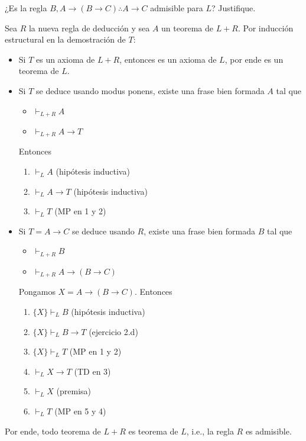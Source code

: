 \begin{exercise}
¿Es la regla $B, A \to (B \to C) \therefore A \to C$ admisible para $L$? Justifique.
\end{exercise}

\begin{solution}
Sea $R$ la nueva regla de deducción y sea $A$ un teorema de $L+R$. Por inducción estructural en la demostración de $T$:

\begin{itemize}
    \item Si $T$ es un axioma de $L+R$, entonces es un axioma de $L$, por ende es un teorema de $L$.
    \item Si $T$ se deduce usando modus ponens, existe una frase bien formada $A$ tal que
    \begin{itemize}
        \item $\vdash_{L+R} A$
        \item $\vdash_{L+R} A \to T$
    \end{itemize}
    
    Entonces
    \begin{enumerate}
        \item $\vdash_L A$       \hfill (hipótesis inductiva)
        \item $\vdash_L A \to T$ \hfill (hipótesis inductiva)
        \item $\vdash_L T$       \hfill (MP en 1 y 2)
    \end{enumerate}
    
    \item Si $T = A \to C$ se deduce usando $R$, existe una frase bien formada $B$ tal que
    \begin{itemize}
        \item $\vdash_{L+R} B$
        \item $\vdash_{L+R} A \to (B \to C)$
    \end{itemize}
    
    Pongamos $X = A \to (B \to C)$. Entonces
    \begin{enumerate}
        \item $\{ X \} \vdash_L B$       \hfill (hipótesis inductiva)
        \item $\{ X \} \vdash_L B \to T$ \hfill (ejercicio 2.d)
        \item $\{ X \} \vdash_L T$       \hfill (MP en 1 y 2)
        \item $\vdash_L X \to T$         \hfill (TD en 3)
        \item $\vdash_L X$               \hfill (premisa)
        \item $\vdash_L T$               \hfill (MP en 5 y 4)
    \end{enumerate}
\end{itemize}

Por ende, todo teorema de $L+R$ es teorema de $L$, i.e., la regla $R$ es admisible.
\end{solution}
